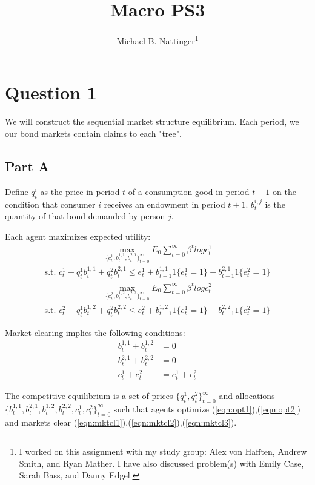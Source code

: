 \documentclass[11pt]{article} %
\title{Macro PS3}
\author{Michael B. Nattinger\footnote{I worked on this assignment with my study group: Alex von Hafften, Andrew Smith, and Ryan Mather. I have also discussed problem(s) with Emily Case, Sarah Bass, and Danny Edgel.}}
\begin{document}
\maketitle
\section{Question 1}
We will construct the sequential market structure equilibrium. Each period, we our bond markets contain claims to each "tree". 
\subsection{Part A}
Define $q_t^i$ as the price in period $t$ of a consumption good in period $t+1$ on the condition that consumer $i$ receives an endowment in period $t+1$. $b_t^{i,j}$ is the quantity of that bond demanded by person $j$.

Each agent maximizes expected utility:
\begin{align}
\max_{\{c_t^1,b_t^{1,1},b_t^{2,1}\}_{t=0}^{\infty}} E_0 \sum_{t=0}^{\infty}\beta^tlog c_t^1 \label{eqn:opt1}
\end{align}
\begin{align*}
\text{s.t. } c_t^1 + q_t^1b_t^{1,1} + q_t^2b_t^{2,1} \leq e_t^1 + b_{t-1}^{1,1}1\{ e_t^1=1 \} +  b_{t-1}^{2,1}1\{ e_t^2=1 \} %
\end{align*}
\begin{align}
\max_{\{c_t^2,b_t^{1,2},b_t^{2,2}\}_{t=0}^{\infty}} E_0 \sum_{t=0}^{\infty}\beta^tlog c_t^2 \label{eqn:opt2} 
\end{align}
\begin{align*}
\text{s.t. } c_t^2 + q_t^1b_t^{1,2} + q_t^2b_t^{2,2} \leq e_t^2 + b_{t-1}^{1,2}1\{ e_t^1=1 \} +  b_{t-1}^{2,2}1\{ e_t^2=1 \} 
\end{align*}

Market clearing implies the following conditions:
\begin{align}
b_t ^{1,1} + b_t^{1,2} &= 0 \label{eqn:mktcl1} \\
b_t ^{2,1} + b_t^{2,2} &= 0 \label{eqn:mktcl2} \\
c_t^1+c_t^2 &= e_t^1 + e_t^2 \label{eqn:mktcl3}
\end{align}

The competitive equilibrium is a set of prices $\{ q_t^1,q_t^2 \}_{t=0}^{\infty}$ and allocations $\{ b_t^{1,1},b_t^{2,1}, b_t^{1,2},b_t^{2,2},c_t^1,c_t^2\}_{t=0}^{\infty}$ such that agents optimize (\ref{eqn:opt1}),(\ref{eqn:opt2}) and markets clear (\ref{eqn:mktcl1}),(\ref{eqn:mktcl2}),(\ref{eqn:mktcl3}).
\end{document}

